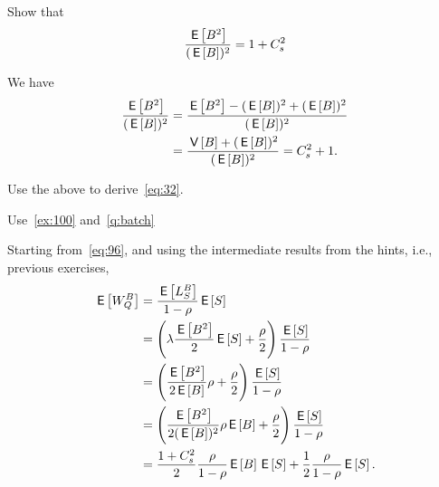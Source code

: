 \begin{extra}\label{q:batch}
Show that 
\begin{equation*}
\frac{\E{B^2}}{(\E{B})^2} = 1+C_s^2
\end{equation*}
\begin{solution}
We have
\begin{align*}
\frac{\E{B^2}}{(\E{B})^2}
  &=\frac{\E{B^2}-(\E B)^2 + (\E B)^2}{(\E{B})^2} \\
&= \frac{\V B + (\E B)^2}{(\E B)^2}= C_s^2+1.
\end{align*}
\end{solution}
\end{extra}


\begin{exercise}
Use the above to derive~\cref{eq:32}.
\begin{hint}
Use~\cref{ex:100} and~\cref{q:batch}
\end{hint}
\begin{solution}
Starting from~\cref{eq:96}, and using the intermediate results from the hints, i.e., previous exercises,
 \begin{align*}
   \E{W^B_{Q}} &= \frac{\E{L_S^B}}{1-\rho}\E{S}\\
  &= \left(\lambda \frac{\E{B^2}}2\E S + \frac\rho 2\right)\frac{\E S}{1-\rho} \\
  &= \left(\frac{\E{B^2}}{2\E B} \rho + \frac \rho 2\right) \frac{\E S}{1-\rho}\\
  &= \left(\frac{\E{B^2}}{2(\E B)^2} \rho \E B + \frac \rho 2\right) \frac{\E S}{1-\rho}\\
  &= \frac{1 + C_s^2}{2} \frac{\rho}{1-\rho} \E B \E S + \frac 1 2 \frac\rho{1-\rho} \E S.
 \end{align*}
\end{solution}
\end{exercise}

